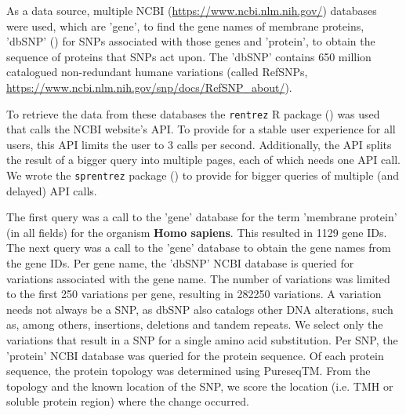 
As a data source, multiple
NCBI (\url{https://www.ncbi.nlm.nih.gov/}) databases were used,
which are 'gene', to find the gene names of membrane proteins, 
'dbSNP' (\cite{sherry2001dbsnp}) for SNPs associated with those genes
and 'protein', to obtain the sequence of proteins that SNPs act upon.
The 'dbSNP' contains 650 million 
catalogued non-redundant humane variations (called RefSNPs,
\url{https://www.ncbi.nlm.nih.gov/snp/docs/RefSNP_about/}).


To retrieve the data from these databases the
\verb;rentrez; R package (\cite{rentrez}) was used
that calls the NCBI website's API. To provide for a 
stable user experience for all users, 
this API limits the user to 3 calls per second.
Additionally, the API splits the result of a bigger
query into multiple pages, each of which needs one API call.
We wrote the \verb;sprentrez; package (\cite{sprentrez}) to provide for 
bigger queries of multiple (and delayed) API calls.


The first query was a call to the 'gene' database for the 
term 'membrane protein' (in all fields) for the organism \textbf{Homo sapiens}.
This resulted in 1129 gene IDs.
The next query was a call to the 'gene' database 
to obtain the gene names from the gene IDs.
Per gene name, the 'dbSNP' NCBI database is queried for 
variations associated with the gene name. 
The number of variations
was limited to the first 250 variations per gene,
resulting in 282250 variations. 
A variation needs not always be a SNP,
as dbSNP also catalogs other DNA alterations, such as, among others, insertions,
deletions and tandem repeats.
We select only the variations that result in a SNP for
a single amino acid substitution.
Per SNP, the 'protein' NCBI database was queried for the
protein sequence.
Of each protein sequence, the protein topology was determined 
using PureseqTM.
From the topology and the known location of the SNP, 
we score the location (i.e. TMH or soluble protein region) 
where the change occurred.

